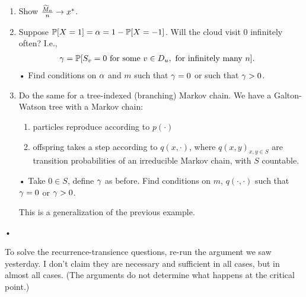 \begin{exr}
\begin{enumerate}
\item
Show $\frac{\widetilde{M}_n}{n}\to x^*$. %
\item
Suppose $\mathbb{P}[X=1] = \alpha = 1-\mathbb{P}[X=-1]$. 
Will the cloud visit 0 infinitely often? I.e., 
\begin{align*}
\gamma &= \mathbb{P}[S_v = 0 \text{ for some }v\in D_u, \text{ for infinitely many }n].
\end{align*}•
Find conditions on $\alpha$ and $m$ such that $\gamma=0$ or such that $\gamma>0$.
\item
Do the same for a tree-indexed (branching) Markov chain. We have a Galton-Watson tree with a Markov chain: 
\begin{enumerate}
\item
particles reproduce according to $p(\cdot)$
\item
offspring takes a step according to %
$q(x,\cdot)$, where $q(x,y)_{x,y\in S}$ are transition probabilities of an irreducible Markov chain, with $S$ countable.
\end{enumerate}•
Take $0\in S$, define $\gamma$ as before. 
Find conditions on $m$, %
$q(\cdot, \cdot)$ such that $\gamma=0$ or $\gamma >0$.

This is a generalization of the previous example.
\end{enumerate}•
\end{exr}
To solve the recurrence-transience questions, re-run the argument we saw yesterday. I don't claim they are necessary and sufficient in all cases, but in almost all cases. (The arguments do not determine what happens at the critical point.)

